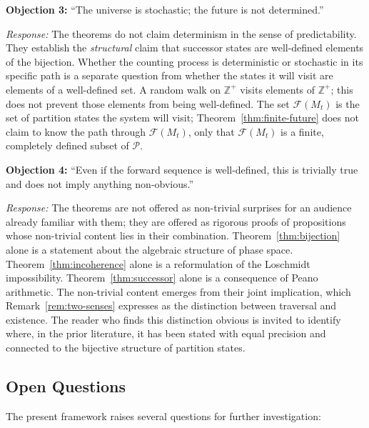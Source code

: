 \documentclass[twocolumn,10pt,a4paper]{article}
\theoremstyle{thmstyle}
\theoremstyle{definition}
\theoremstyle{remark}
\newcommand{\Zp}{\mathbb{Z}^{+}}
\newcommand{\Parts}{\mathcal{P}}
\begin{document}
\textbf{Objection 3:} ``The universe is stochastic; the future is not determined.''

\textit{Response:} The theorems do not claim determinism in the sense of predictability. They establish the \emph{structural} claim that successor states are well-defined elements of the bijection. Whether the counting process is deterministic or stochastic in its specific path is a separate question from whether the states it will visit are elements of a well-defined set. A random walk on $\Zp$ visits elements of $\Zp$; this does not prevent those elements from being well-defined. The set $\mathcal{F}(M_t)$ is the set of partition states the system will visit; Theorem~\ref{thm:finite-future} does not claim to know the path through $\mathcal{F}(M_t)$, only that $\mathcal{F}(M_t)$ is a finite, completely defined subset of $\Parts$.

\textbf{Objection 4:} ``Even if the forward sequence is well-defined, this is trivially true and does not imply anything non-obvious.''

\textit{Response:} The theorems are not offered as non-trivial surprises for an audience already familiar with them; they are offered as rigorous proofs of propositions whose non-trivial content lies in their combination. Theorem~\ref{thm:bijection} alone is a statement about the algebraic structure of phase space. Theorem~\ref{thm:incoherence} alone is a reformulation of the Loschmidt impossibility. Theorem~\ref{thm:successor} alone is a consequence of Peano arithmetic. The non-trivial content emerges from their joint implication, which Remark~\ref{rem:two-senses} expresses as the distinction between traversal and existence. The reader who finds this distinction obvious is invited to identify where, in the prior literature, it has been stated with equal precision and connected to the bijective structure of partition states.

\subsection{Open Questions}

The present framework raises several questions for further investigation:
\end{document}
